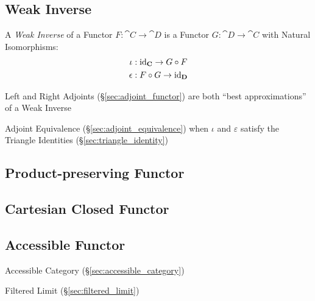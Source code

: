 \subsection{Weak Inverse}\label{sec:weak_inverse}

A \emph{Weak Inverse} of a Functor $F : \cat{C} \rightarrow \cat{D}$
is a Functor $G : \cat{D} \rightarrow \cat{C}$ with Natural
Isomorphisms:
\begin{align*}
  \iota &: \mathrm{id}_\mathbf{C} \rightarrow G \circ F \\
  \epsilon &: F \circ G \rightarrow \mathrm{id}_\mathbf{D}
\end{align*}

Left and Right Adjoints (\S\ref{sec:adjoint_functor}) are both ``best
approximations'' of a Weak Inverse

Adjoint Equivalence (\S\ref{sec:adjoint_equivalence}) when $\iota$ and
$\varepsilon$ satisfy the Triangle Identities
(\S\ref{sec:triangle_identity})



\subsection{Product-preserving Functor}
\label{sec:product_preserving_functor}

\subsection{Cartesian Closed Functor}
\label{sec:cartesian_closed_functor}

\subsection{Accessible Functor}\label{sec:accessible_functor}

Accessible Category (\S\ref{sec:accessible_category})

Filtered Limit (\S\ref{sec:filtered_limit})



